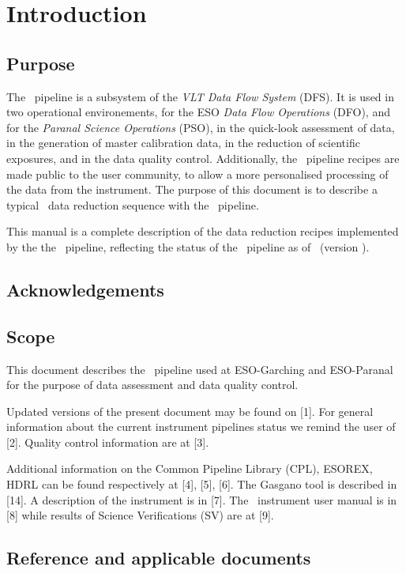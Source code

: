   
\section{Introduction}

\subsection{Purpose}

The \pipename\, pipeline is a subsystem of the 
{\it VLT Data Flow System} (DFS). It is used in two 
operational environements, for the ESO {\it Data Flow Operations} 
(DFO), and for the {\it Paranal Science Operations} (PSO), 
in the quick-look assessment of data, in the generation of master 
calibration data, in the reduction of scientific exposures, 
and in the data quality control. Additionally, the \pipename\, 
pipeline recipes are made public to the user community, to 
allow a more personalised processing of the data from the instrument. 
The purpose of this document is to describe a typical \pipename\, 
data reduction sequence with the \pipename\, pipeline.

This manual is a complete description of the data reduction recipes 
implemented by the the \pipename\, pipeline, reflecting the status 
of the \pipename\, pipeline as of \releasedate\, (version \pipelinevers).

\subsection{Acknowledgements}

\subsection{Scope}

This document describes the \pipename\, pipeline used at ESO-Garching
and ESO-Paranal for the purpose of data assessment and data quality
control. 

Updated versions of the present document may be found on [1].
For general information about the current instrument pipelines status we remind the user of [2].
Quality control information are at [3].

Additional information on the Common Pipeline Library (CPL), ESOREX, HDRL can be found 
respectively at [4], [5], [6]. The Gasgano tool is described in [14]. 
A description of the instrument is in [7]. 
The \pipename\, instrument user manual is in [8] 
while results of Science Verifications (SV) are at [9].

\subsection{Reference and applicable documents}



